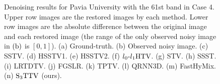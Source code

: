 \begin{figure}[t]
	\vspace{-3mm}
	\caption{Denoising results for Pavia University with the 61st band in Case 4. Upper row images are the restored images by each method. Lower row images are the absolute difference between the original image and each restored image (the range of the only observed noisy image in $\text{(b)}$ is $[0,1]$). (a) Ground-truth. (b) Observed noisy image. (c) SSTV. (d) HSSTV1. (e) HSSTV2. (f) ${l_{0}\text{-}l_{1}\text{HTV}}$. (g) STV. (h) SSST. (i) LRTDTV. (j) FGSLR. (k) TPTV. (l) QRNN3D. (m) FastHyMix. (n) ${\text{S}_{3} \text{TTV}}$ (ours).}
	\label{fig:result_image_Case4_PU}
\end{figure}